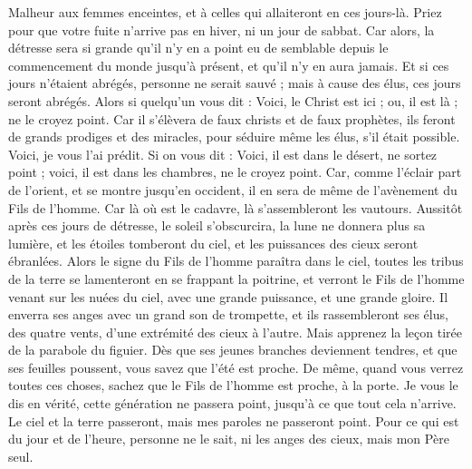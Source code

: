 \begin{multicols}{2}
Malheur aux femmes enceintes, et à celles qui allaiteront en ces jours-là.
Priez pour que votre fuite n’arrive pas en hiver, ni un jour de sabbat.
Car alors, la détresse sera si grande qu’il n’y en a point eu de semblable depuis le commencement du monde jusqu’à présent, et qu’il n’y en aura jamais.
Et si ces jours n’étaient abrégés, personne ne serait sauvé ; mais à cause des élus, ces jours seront abrégés.
Alors si quelqu'un vous dit : Voici, le Christ est ici ; ou, il est là ; ne le croyez point.
Car il s'élèvera de faux christs et de faux prophètes, ils feront de grands prodiges et des miracles, pour séduire même les élus, s'il était possible.
Voici, je vous l'ai prédit.
Si on vous dit : Voici, il est dans le désert, ne sortez point ; voici, il est dans les chambres, ne le croyez point.
Car, comme l'éclair part de l'orient, et se montre jusqu'en occident, il en sera de même de l'avènement du Fils de l'homme.
Car là où est le cadavre, là s'assembleront les vautours.
Aussitôt après ces jours de détresse, le soleil s’obscurcira, la lune ne donnera plus sa lumière, et les étoiles tomberont du ciel, et les puissances des cieux seront ébranlées.
Alors le signe du Fils de l'homme paraîtra dans le ciel, toutes les tribus de la terre se lamenteront en se frappant la poitrine, et verront le Fils de l'homme venant sur les nuées du ciel, avec une grande puissance, et une grande gloire.
Il enverra ses anges avec un grand son de trompette, et ils rassembleront ses élus, des quatre vents, d’une extrémité des cieux à l’autre.
Mais apprenez la leçon tirée de la parabole du figuier. Dès que ses jeunes branches deviennent tendres, et que ses feuilles poussent, vous savez que l'été est proche.
De même, quand vous verrez toutes ces choses, sachez que le Fils de l'homme est proche, à la porte.
Je vous le dis en vérité, cette génération ne passera point, jusqu’à ce que tout cela n’arrive.
Le ciel et la terre passeront, mais mes paroles ne passeront point.
Pour ce qui est du jour et de l’heure, personne ne le sait, ni les anges des cieux, mais mon Père seul.

\end{multicols}

